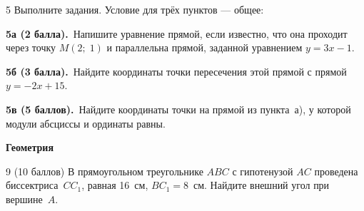 \bigskip

\begin{problem}{5} Выполните задания. Условие для трёх пунктов --- общее:

    \smallskip

\noindent \textbf{5а (2 балла).}~Напишите уравнение прямой, если известно, что она проходит через точку $M(2;\;1)$ и параллельна прямой, заданной уравнением $y = 3x - 1$.

\smallskip

\noindent \textbf{5б (3 балла).}~Найдите координаты точки пересечения этой прямой с прямой $y=-2x+15$.

\smallskip

\noindent \textbf{5в (5 баллов).}~Найдите координаты точки на прямой из пункта~а), у которой модули абсциссы и ординаты равны.
\end{problem}

\noindent{}

\begin{center}
\textbf{Геометрия}
\end{center}


\smallskip


\smallskip


\smallskip

\begin{problem}{9 (10 баллов)}
В прямоугольном треугольнике $ABC$ с гипотенузой $AC$ проведена биссектриса~$CC_1$, равная 16~см, $BC_1 = 8$~см. Найдите внешний угол при вершине~$A$.
\end{problem}

\smallskip


